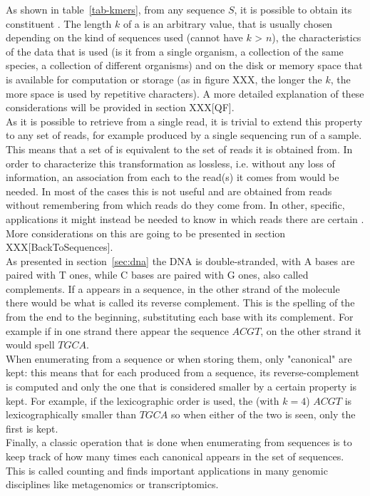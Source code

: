 As shown in table~\ref{tab-kmers}, from any sequence $S$, it is possible to obtain its constituent \kmers. The length $k$ of a \kmer is an arbitrary value, that is usually chosen depending on the kind of sequences used (cannot have $k$ > $n$), the characteristics of the data that is used (is it from a single organism, a collection of the same species, a collection of different organisms) and on the disk or memory space that is available for computation or storage (as in figure XXX, the longer the $k$, the more space is used by repetitive characters). A more detailed explanation of these considerations will be provided in section XXX[QF].\\
As it is possible to retrieve \kmers from a single read, it is trivial to extend this property to any set of reads, for example produced by a single sequencing run of a sample. This means that a set of \kmers is equivalent to the set of reads it is obtained from. In order to characterize this transformation as lossless, i.e. without any loss of information, an association from each \kmer to the read(s) it comes from would be needed. In most of the cases this is not useful and \kmers are obtained from reads without remembering from which reads do they come from. In other, specific, applications it might instead be needed to know in which reads there are certain \kmers. More considerations on this are going to be presented in section XXX[BackToSequences].\\
As presented in section~\ref{sec:dna} the DNA is double-stranded, with A bases are paired with T ones, while C bases are paired with G ones, also called complements. If a \kmer appears in a sequence, in the other strand of the molecule there would be what is called its reverse complement. This is the spelling of the \kmer from the end to the beginning, substituting each base with its complement. For example if in one strand there appear the sequence $ACGT$, on the other strand it would spell $TGCA$.\\
When enumerating \kmers from a sequence or when storing them, only "canonical" \kmers are kept: this means that for each \kmer produced from a sequence, its reverse-complement is computed and only the one that is considered smaller by a certain property is kept. For example, if the lexicographic order is used, the \kmer (with $k=4$) $ACGT$ is lexicographically smaller than $TGCA$ so when either of the two is seen, only the first is kept.\\
Finally, a classic operation that is done when enumerating \kmers from sequences is to keep track of how many times each canonical \kmer appears in the set of sequences. This is called \kmer counting and finds important applications in many genomic disciplines like metagenomics or transcriptomics.

